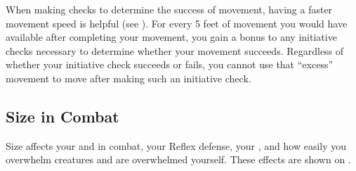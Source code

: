         \label{Movement-Based Initiative}
        When making  checks to determine the success of movement, having a faster movement speed is helpful (see ).
        For every 5 feet of movement you would have available after completing your movement, you gain a  bonus to any initiative checks necessary to determine whether your movement succeeds.
        Regardless of whether your initiative check succeeds or fails, you cannot use that ``excess'' movement to move after making such an initiative check.

    \subsection{Size in Combat}\label{Size in Combat}
        Size affects your  and  in combat, your Reflex defense, your , and how easily you overwhelm creatures and are overwhelmed yourself.
        These effects are shown on .


